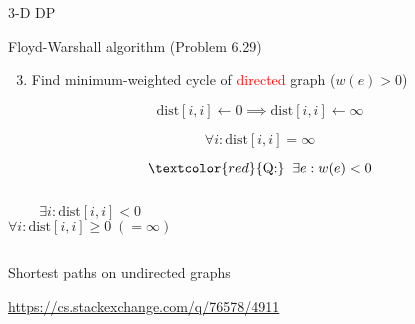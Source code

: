 \begin{frame}{3-D DP}
  \begin{exampleblock}{Floyd-Warshall algorithm (Problem 6.29)}
	\begin{enumerate}[(1)]
	  \setcounter{enumi}{2}
	  \item Find minimum-weighted cycle of \textcolor{red}{directed} graph ($w(e) > 0$)
	\end{enumerate}
  \end{exampleblock}

  \[
	\text{dist}[i,i] \gets 0 \implies \text{dist}[i,i] \gets \infty 
  \]

  \[
	\forall i: \text{dist}[i,i] = \infty
  \]

  \pause
  \[
	\textcolor{red}{\text{Q:}}\;\; \exists e: w(e) < 0
  \]

  \pause
  \begin{columns}
	  \[
		\exists i: \text{dist}[i,i] < 0
	  \]
	  \[
		\forall i: \text{dist}[i,i] \ge 0 \; (= \infty)
	  \]
  \end{columns}
\end{frame}
\begin{frame}{Shortest paths on undirected graphs}

  \centerline{\url{https://cs.stackexchange.com/q/76578/4911}}
\end{frame}
